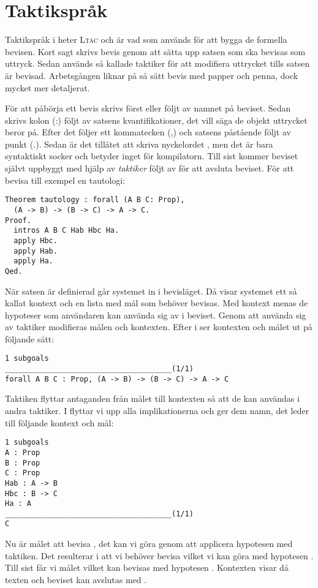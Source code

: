 \section{Taktikspråk}
Taktikspråk i \coq{} heter \textsc{Ltac} och är vad som används för att bygga
de formella bevisen. Kort sagt skrivs bevis genom att sätta upp satsen som ska
bevisas som uttryck. Sedan används så kallade taktiker för att modifiera
uttrycket tills satsen är bevisad. Arbetsgången liknar på så sätt bevis med papper
och penna, dock mycket mer detaljerat.

För att påbörja ett bevis skrivs först  eller  följt av
namnet på beviset. Sedan skrivs kolon (:) följt av satsens kvantifikationer,
det vill säga de objekt uttrycket beror på. Efter det följer ett kommatecken
(,) och satsens påstående följt av punkt (.). Sedan är det tillåtet att skriva
nyckelordet , men det är bara syntaktiskt socker och betyder inget för
kompilatorn. Till sist kommer beviset självt uppbyggt med hjälp av
\emph{taktiker} följt av  för att avsluta beviset. För att bevisa till
exempel en tautologi:

\begin{lstlisting}
Theorem tautology : forall (A B C: Prop),
  (A -> B) -> (B -> C) -> A -> C.
Proof.
  intros A B C Hab Hbc Ha.
  apply Hbc.
  apply Hab.
  apply Ha.
Qed.
\end{lstlisting}

När satsen är definierad går systemet in i bevisläget. Då visar systemet ett så
kallat kontext och en lista med mål som behöver bevisas. Med kontext menas de
hypoteser som användaren kan använda sig av i beviset. Genom att använda sig av
taktiker modifieras målen och kontexten. Efter  i  ser
kontexten och målet ut på följande sätt:
\begin{lstlisting}
1 subgoals
______________________________________(1/1)
forall A B C : Prop, (A -> B) -> (B -> C) -> A -> C
\end{lstlisting}

Taktiken  flyttar antaganden från målet till kontexten så att de kan
användas i andra taktiker. I  flyttar vi upp alla implikationerna
och ger dem namn, det leder till följande kontext och mål:
\begin{lstlisting}
1 subgoals
A : Prop
B : Prop
C : Prop
Hab : A -> B
Hbc : B -> C
Ha : A
______________________________________(1/1)
C
\end{lstlisting}

Nu är målet att bevisa , det kan vi göra genom att applicera hypotesen
 med  taktiken. Det resulterar i att vi behöver bevisa 
vilket vi kan göra med hypotesen . Till sist får vi målet  vilket
kan bevisas med hypotesen . Kontexten visar då texten  och beviset kan avslutas med .
